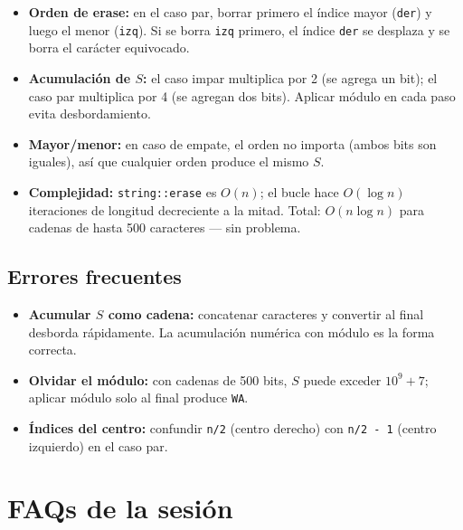 \documentclass[12pt, oneside]{article}
\begin{document}
\begin{notaprofesor}
  \begin{itemize}
    \item \textbf{Orden de erase:} en el caso par, borrar primero el índice
          mayor (\texttt{der}) y luego el menor (\texttt{izq}).  Si se borra
          \texttt{izq} primero, el índice \texttt{der} se desplaza y se borra
          el carácter equivocado.
    \item \textbf{Acumulación de $S$:} el caso impar multiplica por 2 (se
          agrega un bit); el caso par multiplica por 4 (se agregan dos bits).
          Aplicar módulo en cada paso evita desbordamiento.
    \item \textbf{Mayor/menor:} en caso de empate, el orden no importa
          (ambos bits son iguales), así que cualquier orden produce el mismo $S$.
    \item \textbf{Complejidad:} \texttt{string::erase} es $O(n)$; el bucle
          hace $O(\log n)$ iteraciones de longitud decreciente a la mitad.
          Total: $O(n \log n)$ para cadenas de hasta 500 caracteres — sin problema.
  \end{itemize}
\end{notaprofesor}

\subsection{Errores frecuentes}

\begin{notaprofesor}
  \begin{itemize}
    \item \textbf{Acumular $S$ como cadena:} concatenar caracteres y convertir
          al final desborda rápidamente.  La acumulación numérica con módulo
          es la forma correcta.
    \item \textbf{Olvidar el módulo:} con cadenas de 500 bits, $S$ puede
          exceder $10^9+7$; aplicar módulo solo al final produce \texttt{WA}.
    \item \textbf{Índices del centro:} confundir \texttt{n/2} (centro derecho)
          con \texttt{n/2 - 1} (centro izquierdo) en el caso par.
  \end{itemize}
\end{notaprofesor}

\section{FAQs de la sesión}
\end{document}
